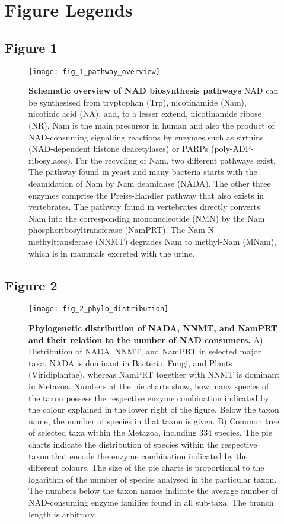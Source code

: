 
\newpage

\section*{Figure Legends}

\subsection*{Figure 1}

\begin{figure}[ht]
  \centering
  \texttt{[image: fig\_1\_pathway\_overview]}
  \caption{\textbf{Schematic overview of NAD biosynthesis pathways} NAD can be synthesised from tryptophan (Trp), nicotinamide (Nam), nicotinic acid (NA), and, to a lesser extend, nicotinamide ribose (NR). Nam is the main precursor in human and also the product of NAD-consuming signalling reactions by enzymes such as sirtuins (NAD-dependent histone deacetylases) or PARPs (poly-ADP-ribosylases). For the recycling of Nam, two different pathways exist. The pathway found in yeast and many bacteria starts with the deamidation of Nam by Nam deamidase (NADA). The other three enzymes comprise the Preiss-Handler pathway that also exists in vertebrates. The pathway found in vertebrates directly converts Nam into the corresponding mononucleotide (NMN) by the Nam phosphoribosyltransferase (NamPRT). The Nam N-methyltransferase (NNMT) degrades Nam to methyl-Nam (MNam), which is in mammals excreted with the urine.}
  \label{fig:pathway_overview}
\end{figure}

\newpage


\subsection*{Figure 2}

\begin{figure}[ht]
  \centering
  \texttt{[image: fig\_2\_phylo\_distribution]}
  \caption{\textbf{Phylogenetic distribution of NADA, NNMT, and NamPRT and their relation to the number of NAD consumers.} A) Distribution of NADA, NNMT, and NamPRT in selected major taxa. NADA is dominant in Bacteria, Fungi, and Plants (Viridiplantae), whereas NamPRT together with NNMT is dominant in Metazoa. Numbers at the pie charts show, how many species of the taxon possess the respective enzyme combination indicated by the colour explained in the lower right of the figure. Below the taxon name, the number of species in that taxon is given. B) Common tree of selected taxa within the Metazoa, including 334 species. The pie charts indicate the distribution of species within the respective taxon that encode the enzyme combination indicated by the different colours. The size of the pie charts is proportional to the logarithm of the number of species analysed in the particular taxon. The numbers below the taxon names indicate the average number of NAD-consuming enzyme families found in all sub-taxa. The branch length is arbitrary.}
  \label{fig:phylo_distribution}
\end{figure}

